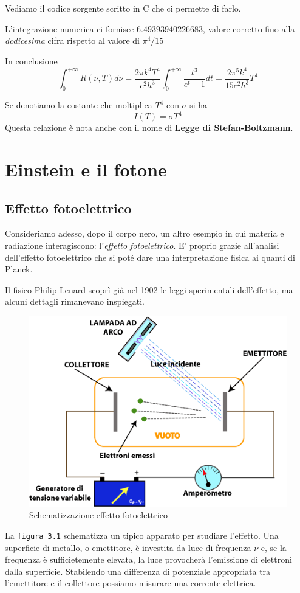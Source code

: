\documentclass[12pt,twoside]{report}
\begin{document}
\par{Vediamo il codice sorgente scritto in C che ci permette di farlo.}

\par{L'integrazione numerica ci fornisce $6.49393940226683$, valore corretto fino alla \textit{dodicesima} cifra rispetto al valore di $\pi^4/15$}
\par{In conclusione}
$$ \int_0^{+\infty}R(\nu,T)d\nu = \frac{2\pi k^4T^4}{c^2h^3}\int_0^{+\infty}\frac{t^3}{e^t-1}dt = \frac{2\pi^5k^4}{15c^2h^3}T^4 $$
\par{Se denotiamo la costante che moltiplica $T^4$ con $\sigma$ si ha $$ I(T) = \sigma T^4 $$ Questa relazione è nota anche con il nome di \textbf{Legge di Stefan-Boltzmann}.}

\chapter{Einstein e il fotone}
\section{Effetto fotoelettrico}
\par{Consideriamo adesso, dopo il corpo nero, un altro esempio in cui materia e radiazione interagiscono: l'\textit{effetto fotoelettrico}. E' proprio grazie all'analisi dell'effetto fotoelettrico che si poté dare una interpretazione fisica ai quanti di Planck.}
\par{Il fisico Philip Lenard scoprì già nel 1902 le leggi sperimentali dell'effetto, ma alcuni dettagli rimanevano inspiegati.}
\begin{figure}[!h]
\centering
\includegraphics[width = 0.5\hsize]{./figures/effFoto}
\caption{Schematizzazione effetto fotoelettrico}
\label{fig:logo}
\end{figure}
\par{La \texttt{figura 3.1} schematizza un tipico apparato per studiare l'effetto. Una superficie di metallo, o emettitore, è investita da luce di frequenza $\nu$ e, se la frequenza è sufficietemente elevata, la luce provocherà l'emissione di elettroni dalla superficie. Stabilendo una differenza di potenziale appropriata tra l'emettitore e il collettore possiamo misurare una corrente elettrica.}
\end{document}
